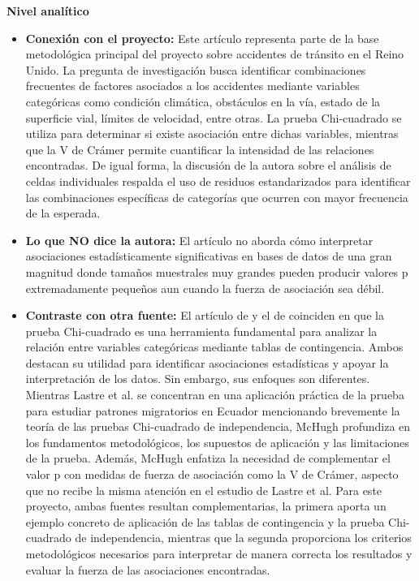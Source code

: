 \documentclass[12pt]{article}
\begin{document}
\textbf{Nivel analítico}
\begin{itemize}
    \item \textbf{Conexión con el proyecto:} Este artículo representa parte de la base metodológica principal del proyecto 
    sobre accidentes de tránsito en el Reino Unido. La pregunta de investigación busca identificar combinaciones 
    frecuentes de factores asociados a los accidentes mediante variables categóricas como condición climática, obstáculos en 
    la vía, estado de la superficie vial, límites de velocidad, entre otras. La prueba Chi-cuadrado se utiliza para determinar 
    si existe asociación entre dichas variables, mientras que la V de Crámer permite cuantificar la intensidad de las relaciones
    encontradas. De igual forma, la discusión de la autora sobre el análisis de celdas individuales respalda el uso de residuos 
    estandarizados para identificar las combinaciones específicas de categorías que ocurren con mayor frecuencia de la esperada.

    \item \textbf{Lo que NO dice la autora:} El artículo no aborda cómo interpretar asociaciones estadísticamente significativas 
    en bases de datos de una gran magnitud donde tamaños muestrales muy grandes pueden producir valores p extremadamente pequeños aun cuando 
    la fuerza de asociación sea débil.

    \item \textbf{Contraste con otra fuente:} El artículo de \textcite{McHugh2013} y el de \textcite{LASTRE2019} 
    coinciden en que la prueba Chi-cuadrado es una herramienta fundamental para analizar 
    la relación entre variables categóricas mediante tablas de contingencia. Ambos destacan 
    su utilidad para identificar asociaciones estadísticas y apoyar la interpretación de los 
    datos. Sin embargo, sus enfoques son diferentes. Mientras Lastre et al. se concentran en 
    una aplicación práctica de la prueba para estudiar patrones migratorios en Ecuador 
    mencionando brevemente la teoría de las pruebas Chi-cuadrado de independencia, 
    McHugh profundiza en los fundamentos metodológicos, los supuestos de aplicación y las 
    limitaciones de la prueba. Además, McHugh enfatiza la necesidad de complementar el valor 
    p con medidas de fuerza de asociación como la V de Crámer, aspecto que no recibe la 
    misma atención en el estudio de Lastre et al. Para este proyecto, ambas fuentes resultan 
    complementarias, la primera aporta un ejemplo concreto de aplicación de las tablas de 
    contingencia y la prueba Chi-cuadrado de independencia, mientras que la segunda proporciona 
    los criterios metodológicos necesarios para interpretar de manera correcta los resultados y 
    evaluar la fuerza de las asociaciones encontradas. 


\end{itemize}
\end{document}
